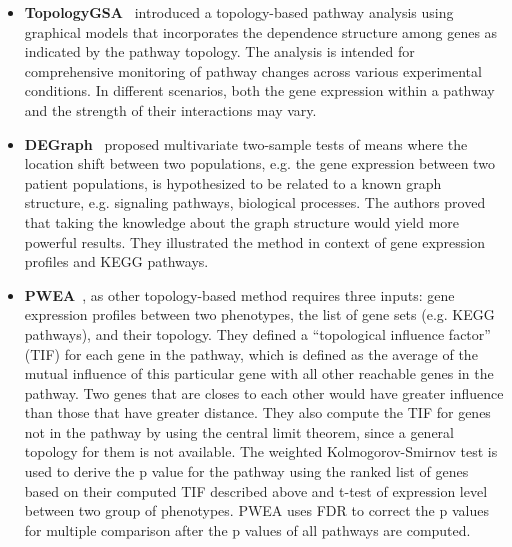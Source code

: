 \begin{itemize}
\item \textbf{TopologyGSA}~\cite{Massa:2010} introduced a topology-based pathway analysis using graphical models that incorporates the dependence structure among genes as indicated by the pathway topology. The analysis is intended for comprehensive monitoring of pathway changes across various experimental conditions. In different scenarios, both the gene expression within a pathway and the strength of their interactions may vary. 

\item \textbf{DEGraph}~\cite{Jacob:2010} proposed multivariate two-sample tests of means where the location shift between two populations, e.g. the gene expression between two patient populations, is hypothesized to be related to a known graph structure, e.g. signaling pathways, biological processes. The authors proved that taking the knowledge about the graph structure would yield more powerful results. They illustrated the method in context of gene expression profiles and KEGG pathways.

\item \textbf{PWEA}~\cite{Hung:2010}, as other topology-based method requires three inputs: gene expression profiles between two phenotypes, the list of gene sets (e.g. KEGG pathways), and their topology. They defined a ``topological influence factor'' (TIF) for each gene in the pathway, which is defined as the average of the mutual influence of this particular gene with all other reachable genes in the pathway. Two genes that are closes to each other would have greater influence than those that have greater distance. They also compute the TIF for genes not in the pathway by using the central limit theorem, since a general topology for them is not available. The weighted Kolmogorov-Smirnov test is used to derive the p value for the pathway using the ranked list of genes based on their computed TIF described above and t-test of expression level between two group of phenotypes. PWEA uses FDR to correct the p values for multiple comparison after the p values of all pathways are computed.



\end{itemize}
